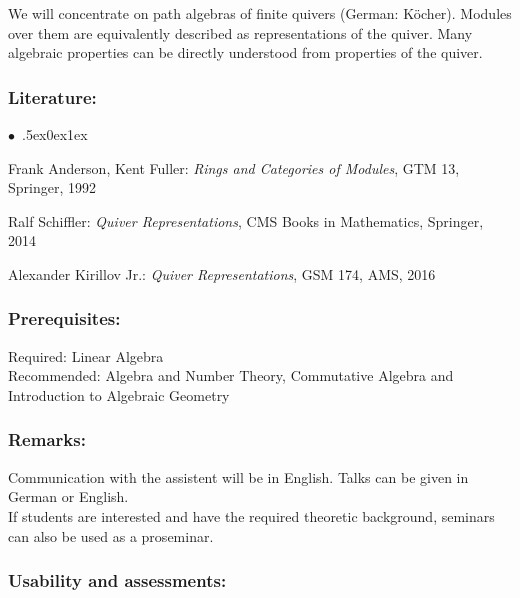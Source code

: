 \documentclass[a4paper,10pt]{article}
\renewenvironment{itemize}{\begin{list}{$\bullet$\ }{\itemsep.5ex\setlength{\topsep}{0.5\itemsep}\parsep0ex\labelsep1ex\settowidth{\labelwidth}{$\bullet$\ }\setlength{\leftmargin}{\labelwidth}\addtolength{\leftmargin}{3ex}\addtolength{\leftmargin}{\labelsep}}}{\end{list}}
\begin{document}
We will concentrate on path algebras of finite quivers (German: Köcher). Modules over them are equivalently described as representations of the quiver. Many algebraic properties can be directly understood from properties of the quiver. 
\subsubsection*{\large
    Literature:
}
\begin{itemize}
\item
Frank Anderson, Kent Fuller: \emph{Rings and Categories of Modules}, GTM 13, Springer, 1992 
\item
Ralf Schiffler: \emph{Quiver Representations}, CMS Books in Mathematics, Springer, 2014 
\item
Alexander Kirillov Jr.: \emph{Quiver Representations}, GSM 174, AMS, 2016
\end{itemize}
\subsubsection*{\large
    Prerequisites:
}
Required: Linear Algebra \\ Recommended: Algebra and Number Theory, Commutative Algebra and Introduction to Algebraic Geometry
\subsubsection*{\large
    Remarks:
}
Communication with the assistent will be in English. Talks can be given in German or English.\\
If students are interested and have the required theoretic background, seminars can also be used as a proseminar. \\
\subsubsection*{\large
    Usability and assessments:
}
\end{document}
